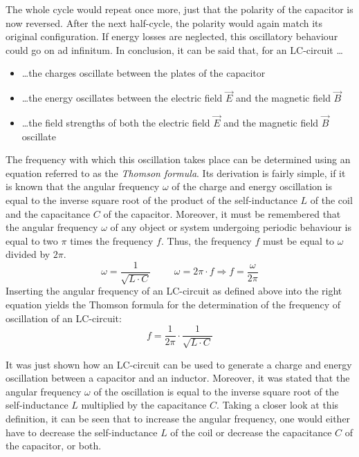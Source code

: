 The whole cycle would repeat once more, just that the polarity of the capacitor is now reversed. After the next half-cycle, the polarity would again match its original configuration. If energy losses are neglected, this oscillatory behaviour could go on ad infinitum. In conclusion, it can be said that, for an LC-circuit \dots

\begin{itemize}
	
	\item \dots the charges oscillate between the plates of the capacitor

	\item \dots the energy oscillates between the electric field $\vec{E}$ and the magnetic field $\vec{B}$

	\item \dots the field strengths of both the electric field $\vec{E}$ and the magnetic field $\vec{B}$ oscillate

\end{itemize}

The frequency with which this oscillation takes place can be determined using an equation referred to as the \emph{Thomson formula}. Its derivation is fairly simple, if it is known that the angular frequency $\omega$ of the charge and energy oscillation is equal to the inverse square root of the product of the self-inductance $L$ of the coil and the capacitance $C$ of the capacitor. Moreover, it must be remembered that the angular frequency $\omega$ of any object or system undergoing periodic behaviour is equal to two $\pi$ times the frequency $f$. Thus, the frequency $f$ must be equal to $\omega$ divided by $2 \pi$. $$\omega = \frac{1}{\sqrt{L \cdot C}} \hspace{1cm} \omega = 2\pi \cdot f \Rightarrow f = \frac{\omega}{2\pi}$$ Inserting the angular frequency of an LC-circuit as defined above into the right equation yields the Thomson formula for the determination of the frequency of oscillation of an LC-circuit: $$f = \frac{1}{2\pi} \cdot \frac{1}{\sqrt{L \cdot C}}$$

\pagebreak


It was just shown how an LC-circuit can be used to generate a charge and energy oscillation between a capacitor and an inductor. Moreover, it was stated that the angular frequency $\omega$ of the oscillation is equal to the inverse square root of the self-inductance $L$ multiplied by the capacitance $C$. Taking a closer look at this definition, it can be seen that to increase the angular frequency, one would either have to decrease the self-inductance $L$ of the coil or decrease the capacitance $C$ of the capacitor, or both.


